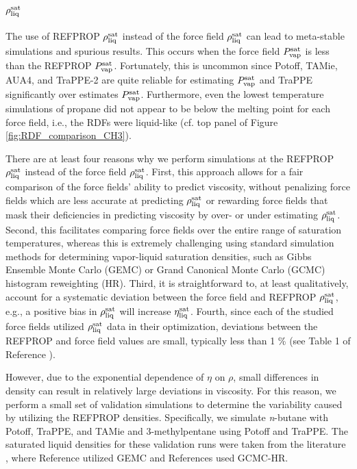 \documentclass[preprint,review,12pt]{elsarticle}
\begin{document}
	\subsection{$\rho_{\rm liq}^{\rm sat}$}
	
	The use of REFPROP $\rho_{\rm liq}^{\rm sat}$ instead of the force field $\rho_{\rm liq}^{\rm sat}$ can lead to meta-stable simulations and spurious results. This occurs when the force field $P_{\rm vap}^{\rm sat}$ is less than the REFPROP $P_{\rm vap}^{\rm sat}$. Fortunately, this is uncommon since Potoff, TAMie, AUA4, and TraPPE-2 are quite reliable for estimating $P_{\rm vap}^{\rm sat}$ and TraPPE significantly over estimates $P_{\rm vap}^{\rm sat}$. Furthermore, even the lowest temperature simulations of propane did not appear to be below the melting point for each force field, i.e., the RDFs were liquid-like (cf. top panel of Figure \ref{fig:RDF_comparison_CH3}). 
	
	There are at least four reasons why we perform simulations at the REFPROP $\rho_{\rm liq}^{\rm sat}$ instead of the force field $\rho_{\rm liq}^{\rm sat}$. First, this approach allows for a fair comparison of the force fields' ability to predict viscosity, without penalizing force fields which are less accurate at predicting $\rho_{\rm liq}^{\rm sat}$ or rewarding force fields that mask their deficiencies in predicting viscosity by over- or under estimating $\rho_{\rm liq}^{\rm sat}$.
	Second, this facilitates comparing force fields over the entire range of saturation temperatures, whereas this is extremely challenging using standard simulation methods for determining vapor-liquid saturation densities, such as Gibbs Ensemble Monte Carlo (GEMC) or Grand Canonical Monte Carlo (GCMC) histogram reweighting (HR). Third, it is straightforward to, at least qualitatively, account for a systematic deviation between the force field and REFPROP $\rho_{\rm liq}^{\rm sat}$, e.g., a positive bias in $\rho_{\rm liq}^{\rm sat}$ will increase $\eta_{\rm liq}^{\rm sat}$. Fourth, since each of the studied force fields utilized $\rho_{\rm liq}^{\rm sat}$ data in their optimization, deviations between the REFPROP and force field values are small, typically less than 1 \% (see Table 1 of Reference ). 
	
	However, due to the exponential dependence of $\eta$ on $\rho$, small differences in density can result in relatively large deviations in viscosity. For this reason, we perform a small set of validation simulations to determine the variability caused by utilizing the REFPROP densities. Specifically, we simulate \textit{n}-butane with Potoff, TraPPE, and TAMie and 3-methylpentane using Potoff and TraPPE. The saturated liquid densities for these validation runs were taken from the literature \cite{Martin1999,Mie,Potoff_branched,TAMie}, where Reference  utilized GEMC and References  used GCMC-HR.      
	
\end{document}
